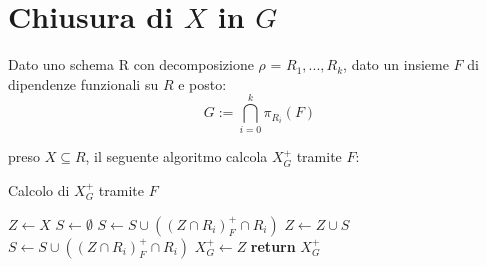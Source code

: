 \documentclass{article}
\begin{document}
\section{Chiusura di $X$ in $G$}
Dato uno schema R con decomposizione $\rho$ = $R_1,...,R_k$, dato un insieme $F$ di dipendenze funzionali su $R$ e posto:
\[ G := \bigcap_{i=0}^{k} \pi_{R_i}(F) \]\par
preso $X \subseteq R$, il seguente algoritmo calcola $X_G^+$ tramite $F$:
\begin{algorithm}
  \caption{Calcolo di $X_G^+$ tramite $F$}
  \begin{algorithmic}[1]
          \State $Z \gets X$
          \State $S \gets \emptyset$
              \State $S \gets S \cup ((Z \cap R_i)^+_F \cap R_i)$
          \EndFor
              \State $Z \gets Z \cup S$
                  \State $S \gets S \cup ((Z \cap R_i)^+_F \cap R_i)$
              \EndFor
          \EndWhile
          \State $X_G^+ \gets Z$
          \State \textbf{return} $X_G^+$
      \EndProcedure
  \end{algorithmic}
\end{algorithm}
\end{document}
